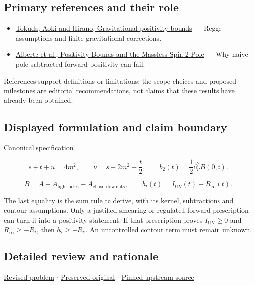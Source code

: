 \documentclass[
  11pt,
]{article}
\begin{document}
\subsection{Primary references and their role}

\begin{itemize}
\item
  \href{https://arxiv.org/abs/2007.15009}{Tokuda, Aoki and Hirano,
  Gravitational positivity bounds} --- Regge assumptions and finite
  gravitational corrections.
\item
  \href{https://arxiv.org/abs/2007.12667}{Alberte et al., Positivity
  Bounds and the Massless Spin-2 Pole} --- Why naive pole-subtracted
  forward positivity can fail.
\end{itemize}

References support definitions or limitations; the scope choices and
proposed milestones are editorial recommendations, not claims that these
results have already been obtained.

\subsection{Displayed formulation and claim boundary}

\href{https://github.com/rick-stevens-ai/Pure-Thought/blob/main/PRDs/02-Gravitational-Positivity-Bounds.md}{Canonical
specification}.

\[s+t+u=4m^2,\qquad \nu=s-2m^2+\frac t2,\qquad
b_2(t)=\frac12\partial_\nu^2 B(0,t).\]

\[B=A-A_{\mathrm{light\ poles}}-A_{\mathrm{chosen\ low\ cuts}},\qquad
b_2(t)=I_{\mathrm{UV}}(t)+R_\infty(t).\]

The last equality is the sum rule to derive, with its kernel,
subtractions and contour assumptions. Only a justified smearing or
regulated forward prescription can turn it into a positivity statement.
If that prescription proves \(I_{\mathrm{UV}}\ge0\) and
\(R_\infty\ge-R_*\), then \(b_2\ge-R_*\). An uncontrolled contour term
must remain unknown.

\subsection{Detailed review and rationale}

\href{https://github.com/rick-stevens-ai/Pure-Thought/blob/main/PRDs/02-Gravitational-Positivity-Bounds.md}{Revised
problem} \ensuremath{\cdot}
\href{https://github.com/rick-stevens-ai/Pure-Thought/blob/main/archive/original-PRDs/02-Gravitational-Positivity-Bounds.md}{Preserved
original} \ensuremath{\cdot}
\href{https://github.com/rick-stevens-ai/Pure-Thought/blob/f854d4e12b55c1f5b5c2a964b75f2d23496d981e/PRDs/02-Gravitational-Positivity-Bounds.md}{Pinned
upstream source}
\end{document}
